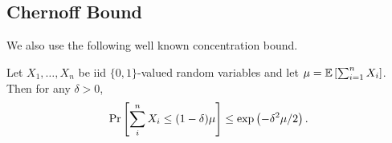 \subsection{Chernoff Bound}
We also use the following well known concentration bound.
\begin{theorem}\label{thm:Chernoff}
    Let $X_1, \dots, X_n$ be iid $\{0,1\}$-valued random variables and let $\mu = \mathbb{E}\left[\sum_{i=1}^nX_i\right]$. Then for any $\delta > 0$,
    $$\Pr\left[\sum_i^nX_i \leq (1-\delta)\mu\right] \leq \textnormal{exp}\left(-\delta^2\mu/2\right).$$
\end{theorem} 
